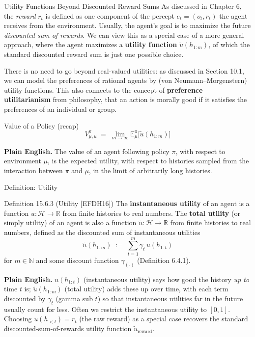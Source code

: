 \documentclass[aspectratio=169,10pt]{beamer}
\newcommand{\R}{\mathbb{R}}
\newcommand{\N}{\mathbb{N}}
\newcommand{\E}{\mathbb{E}}
\newcommand{\Hc}{\mathcal{H}}
\newcommand{\hlt}{h_{<t}}
\begin{document}
\begin{frame}{Utility Functions Beyond Discounted Reward Sums}
  As discussed in Chapter 6, the \emph{reward} $r_t$ is defined as one
  component of the percept $e_t=(o_t,r_t)$ the agent receives from the
  environment. Usually, the agent's goal is to maximize the future
  \emph{discounted sum of rewards}. We can view this as a special case of
  a more general approach, where the agent maximizes a \textbf{utility
  function} $\tilde u(h_{1:m})$, of which the standard discounted reward
  sum is just one possible choice.

  \vspace{0.4em}
  There is no need to go beyond real-valued utilities: as discussed in
  Section 10.1, we can model the preferences of rational agents by
  (von Neumann--Morgenstern) utility functions. This also connects to the
  concept of \textbf{preference utilitarianism} from philosophy, that an
  action is morally good if it satisfies the preferences of an individual
  or group.

  \begin{block}{Value of a Policy (recap)}
    \[
      V^\pi_{\mu,u} \;=\; \lim_{m\to\infty}\E^\pi_\mu\big[\tilde u(h_{1:m})\big]
    \]
  \end{block}
  \textbf{Plain English.} The value of an agent following policy $\pi$,
  with respect to environment $\mu$, is the expected utility, with
  respect to histories sampled from the interaction between $\pi$ and
  $\mu$, in the limit of arbitrarily long histories.
\end{frame}

\begin{frame}{Definition: Utility}
  \begin{block}{Definition 15.6.3 (Utility [EFDH16])}
    The \textbf{instantaneous utility} of an agent is a function
    $u:\Hc\to\R$ from finite histories to real numbers. The \textbf{total
    utility} (or simply utility) of an agent is also a function
    $\tilde u:\Hc\to\R$ from finite histories to real numbers, defined as
    the discounted sum of instantaneous utilities
    \[
      \tilde u(h_{1:m}) \;:=\; \sum_{t=1}^m \gamma_t\, u(h_{1:t})
    \]
    for $m\in\N$ and some discount function $\gamma_{(\cdot)}$
    (Definition 6.4.1).
  \end{block}

  \textbf{Plain English.} $u(h_{1:t})$ (instantaneous utility) says how
  good the history \emph{up to} time $t$ is; $\tilde u(h_{1:m})$ (total
  utility) adds these up over time, with each term discounted by
  $\gamma_t$ (gamma sub $t$) so that instantaneous utilities far in the
  future usually count for less. Often we restrict the instantaneous
  utility to $[0,1]$. Choosing $u(\hlt)=r_t$ (the raw reward) as a special
  case recovers the standard discounted-sum-of-rewards utility function
  $\tilde u_{\text{reward}}$.
\end{frame}
\end{document}
